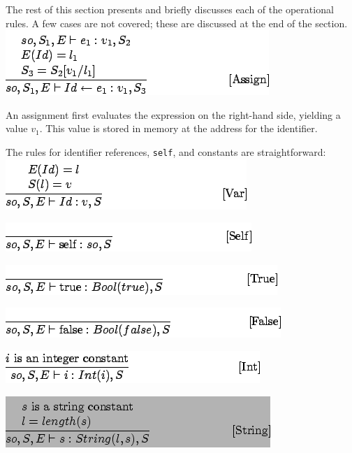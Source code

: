 \documentclass[]{article}
\begin{document}
The rest of this section presents and briefly discusses each of the
operational rules. A few cases are not covered; these are discussed at
the end of the section. \\

\includegraphics{img157.png}

An assignment first evaluates the expression on the right-hand side,
yielding a value $v_1$. This value is stored in memory at the address
for the identifier.

The rules for identifier references, \texttt{self}, and constants are
straightforward: \\

\includegraphics{img159.png}

\includegraphics{img160.png}

\includegraphics{img161.png}

\includegraphics{img162.png}

\includegraphics{img163.png}

\includegraphics{img164.png}
\end{document}
